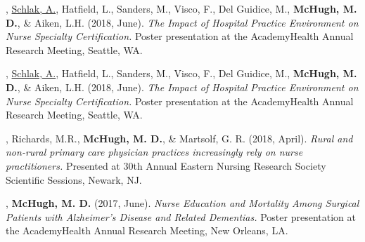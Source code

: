 \documentclass[10pt,]{article}
\begin{document}
{{{{{{{{{{{{{{{\begin{hangparas}{.25in}{1}
\end{hangparas}



\begin{hangparas}{.25in}{1}

, {\underline {Schlak, A.}}, Hatfield, L., Sanders, M., Visco, F., Del Guidice, M., {\textbf {McHugh, M. D.}}, \& Aiken, L.H. (2018, June). {\textit {The Impact of Hospital Practice Environment on Nurse Specialty Certification.}} Poster presentation at the AcademyHealth Annual Research Meeting, Seattle, WA.

\end{hangparas}



\begin{hangparas}{.25in}{1}

, {\underline {Schlak, A.}}, Hatfield, L., Sanders, M., Visco, F., Del Guidice, M., {\textbf {McHugh, M. D.}}, \& Aiken, L.H. (2018, June). {\textit {The Impact of Hospital Practice Environment on Nurse Specialty Certification.}} Poster presentation at the AcademyHealth Annual Research Meeting, Seattle, WA.

\end{hangparas}



\begin{hangparas}{.25in}{1}

, Richards, M.R., {\textbf {McHugh, M. D.}}, \& Martsolf, G. R. (2018, April). {\textit {Rural and non-rural primary care physician practices increasingly rely on nurse practitioners.}} Presented at 30th Annual Eastern Nursing Research Society Scientific Sessions, Newark, NJ.

\end{hangparas}



\begin{hangparas}{.25in}{1}

, {\textbf {McHugh, M. D.}} (2017, June). {\textit {Nurse Education and Mortality Among Surgical Patients with Alzheimer’s Disease and Related Dementias.}} Poster presentation at the AcademyHealth Annual Research Meeting, New Orleans, LA.

\end{hangparas}



\begin{hangparas}{.25in}{1}


\end{hangparas}}}}}}}}}}}}}}}}
\end{document}
